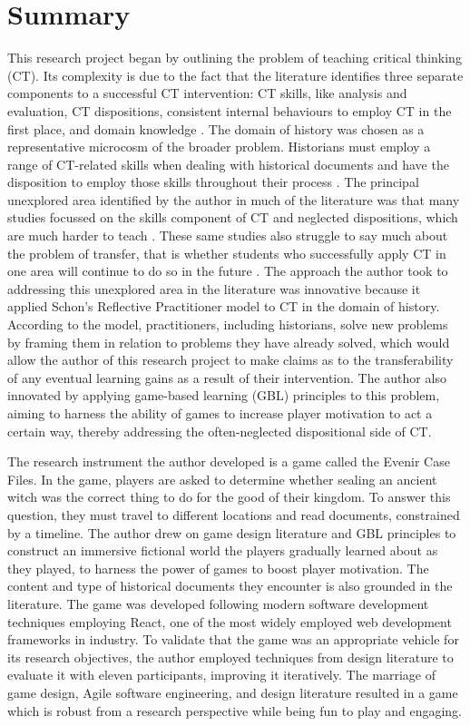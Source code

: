 \documentclass{l4proj}
\begin{document}
\section{Summary}
This research project began by outlining the problem of teaching critical thinking (CT). Its complexity is due to the fact that the literature identifies three separate components to a successful CT intervention: CT skills, like analysis and evaluation, CT dispositions, consistent internal behaviours to employ CT in the first place, and domain knowledge \citep{lai2011critical}. The domain of history was chosen as a representative microcosm of the broader problem. Historians must employ a range of CT-related skills when dealing with historical documents and have the disposition to employ those skills throughout their process \citep{tosh2006pursuit}. The principal unexplored area identified by the author in much of the literature was that many studies focussed on the skills component of CT and neglected dispositions, which are much harder to teach \citep{facione2000CT,lai2011critical}. These same studies also struggle to say much about the problem of transfer, that is whether students who successfully apply CT in one area will continue to do so in the future \citep{crouch2015predicting,willingham2008critical}. The approach the author took to addressing this unexplored area in the literature was innovative because it applied Schon’s Reflective Practitioner model to CT in the domain of history. According to the model, practitioners, including historians, solve new problems by framing them in relation to problems they have already solved, which would allow the author of this research project to make claims as to the transferability of any eventual learning gains as a result of their intervention. The author also innovated by applying game-based learning (GBL) principles to this problem, aiming to harness the ability of games to increase player motivation to act a certain way, thereby addressing the often-neglected dispositional side of CT. 

The research instrument the author developed is a game called the Evenir Case Files. In the game, players are asked to determine whether sealing an ancient witch was the correct thing to do for the good of their kingdom. To answer this question, they must travel to different locations and read documents, constrained by a timeline.  The author drew on game design literature and GBL principles to construct an immersive fictional world the players gradually learned about as they played, to harness the power of games to boost player motivation. The content and type of historical documents they encounter is also grounded in the literature. The game was developed following modern software development techniques employing React, one of the most widely employed web development frameworks in industry. To validate that the game was an appropriate vehicle for its research objectives, the author employed techniques from design literature to evaluate it with eleven participants, improving it iteratively. The marriage of game design, Agile software engineering, and design literature resulted in a game which is robust from a research perspective while being fun to play and engaging. 
\end{document}
